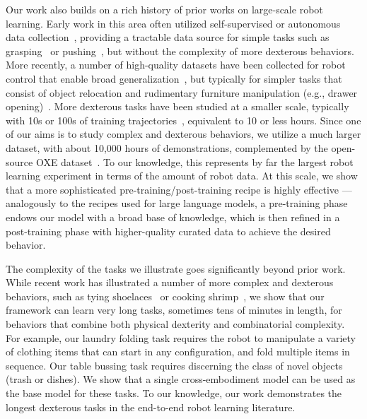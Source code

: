Our work also builds on a rich history of prior works on large-scale robot learning. Early work in this area often utilized self-supervised or autonomous data collection~\citep{levine2016learninghandeyecoordinationrobotic, kalashnikov2018qtoptscalabledeepreinforcement, cabi2020scalingdatadrivenroboticsreward}, providing a tractable data source for simple tasks such as grasping~\citep{gupta2018robotlearninghomesimproving, pinto2015supersizingselfsupervisionlearninggrasp} or pushing~\citep{yu2016more}, but without the complexity of more dexterous behaviors. More recently, a number of high-quality datasets have been collected for robot control that enable broad generalization~\citep{khazatsky2024droid, collaboration2023open, walke2023bridgedata, mandlekar2018roboturkcrowdsourcingplatformrobotic, mandlekar2023mimicgendatagenerationscalable, shafiullah2023bringingrobotshome, ebert2021bridgedataboostinggeneralization, bharadhwaj2023roboagentgeneralizationefficiencyrobot}, but typically for simpler tasks that consist of object relocation and rudimentary furniture manipulation (e.g., drawer opening)~\citep{liu2024ok, etukuru2024robotutilitymodelsgeneral}. More dexterous tasks have been studied at a smaller scale, typically with 10s or 100s of training trajectories~\citep{zhao2023learning}, equivalent to 10 or less hours. Since one of our aims is to study complex and dexterous behaviors, we utilize a much larger dataset, with about 10,000 hours of demonstrations, complemented by the open-source OXE dataset~\citep{collaboration2023open}. To our knowledge, this represents by far the largest robot learning experiment in terms of the amount of robot data. At this scale, we show that a more sophisticated pre-training/post-training recipe is highly effective --- analogously to the recipes used for large language models, a pre-training phase endows our model with a broad base of knowledge, which is then refined in a post-training phase with higher-quality curated data to achieve the desired behavior.

The complexity of the tasks we illustrate goes significantly beyond prior work. While recent work has illustrated a number of more complex and dexterous behaviors, such as tying shoelaces~\citep{zhao2024alohaunleashedsimplerecipe} or cooking shrimp~\citep{fu2024mobile}, we show that our framework can learn very long tasks, sometimes tens of minutes in length, for behaviors that combine both physical dexterity and combinatorial complexity. For example, our laundry folding task requires the robot to manipulate a variety of clothing items that can start in any configuration, and fold multiple items in sequence. Our table bussing task requires discerning the class of novel objects (trash or dishes). We show that a single cross-embodiment model can be used as the base model for these tasks. To our knowledge, our work demonstrates the longest dexterous tasks in the end-to-end robot learning literature.

